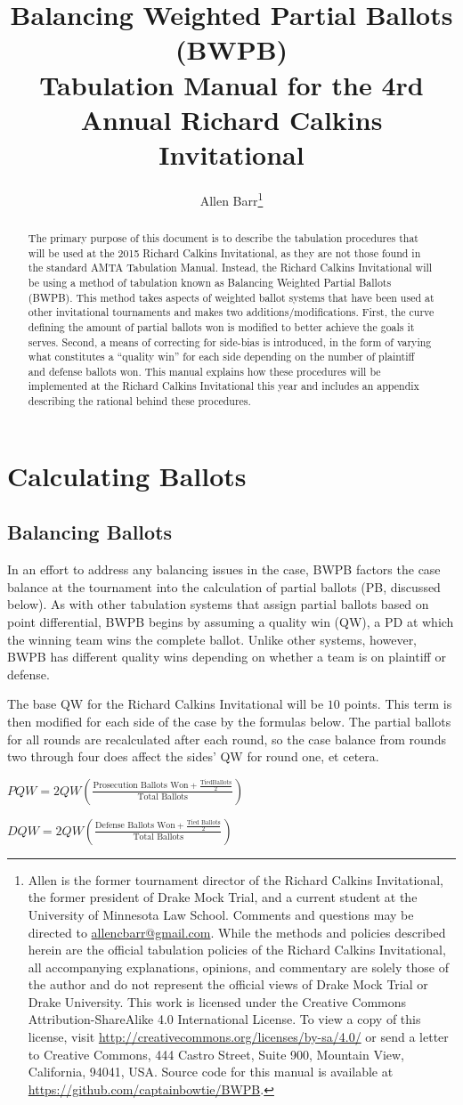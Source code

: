 \documentclass{article}
\title{\textbf{Balancing Weighted Partial Ballots (BWPB)}\\ \large  Tabulation Manual for the 4rd Annual Richard Calkins Invitational}
\author{Allen Barr\footnote{Allen is the former tournament director of the Richard Calkins Invitational, the former president of Drake Mock Trial, and a current student at the University of Minnesota Law School.  Comments and questions may be directed to \href{mailto:allencbarr@gmail.com}{allencbarr@gmail.com}.  While the methods and policies described herein are the official tabulation policies of the Richard Calkins Invitational, all accompanying explanations, opinions, and commentary are solely those of the author and do not represent the official views of Drake Mock Trial  or Drake University.  This work is licensed under the Creative Commons Attribution-ShareAlike 4.0 International License. To view a copy of this license, visit \url{http://creativecommons.org/licenses/by-sa/4.0/} or send a letter to Creative Commons, 444 Castro Street, Suite 900, Mountain View, California, 94041, USA. Source code for this manual is available at \url{https://github.com/captainbowtie/BWPB}.}}
\begin{document}
\maketitle
\begin{abstract}
The primary purpose of this document is to describe the tabulation procedures that will be used at the 2015 Richard Calkins Invitational, as they are not those found in the standard AMTA Tabulation Manual.  Instead, the Richard Calkins Invitational will be using a method of tabulation known as Balancing Weighted Partial Ballots (BWPB).  This method takes aspects of weighted ballot systems that have been used at other invitational tournaments and makes two additions/modifications.  First, the curve defining the amount of partial ballots won is modified to better achieve the goals it serves.  Second, a means of correcting for side-bias is introduced, in the form of varying what constitutes a ``quality win'' for each side depending on the number of plaintiff and defense ballots won.  This manual explains how these procedures will be implemented at the Richard Calkins Invitational this year and includes an appendix describing the rational behind these procedures.
\end{abstract}
\section{Calculating Ballots}
\subsection{Balancing Ballots}
In an effort to address any balancing issues in the case, BWPB factors the case balance at the tournament into the calculation of partial ballots (PB, discussed below). As with other tabulation systems that assign partial ballots based on point differential, BWPB begins by assuming a quality win (QW), a PD at which the winning team wins the complete ballot. Unlike other systems, however, BWPB has different quality wins depending on whether a team is on plaintiff or defense.

The base QW for the Richard Calkins Invitational will be $10$ points. This term is then modified for each side of the case by the formulas below. The partial ballots for all rounds are recalculated after each round, so the case balance from rounds two through four does affect the sides' QW for round one, et cetera.
\begin{center}
$PQW=2QW\left(\frac{\mbox{Prosecution Ballots Won}+\frac{\mbox{TiedBallots}}{2}}{\mbox{Total Ballots}}\right)$

$DQW=2QW\left(\frac{\mbox{Defense Ballots Won}+\frac{\mbox{Tied Ballots}}{2}}{\mbox{Total Ballots}}\right)$
\end{center}
\end{document}
